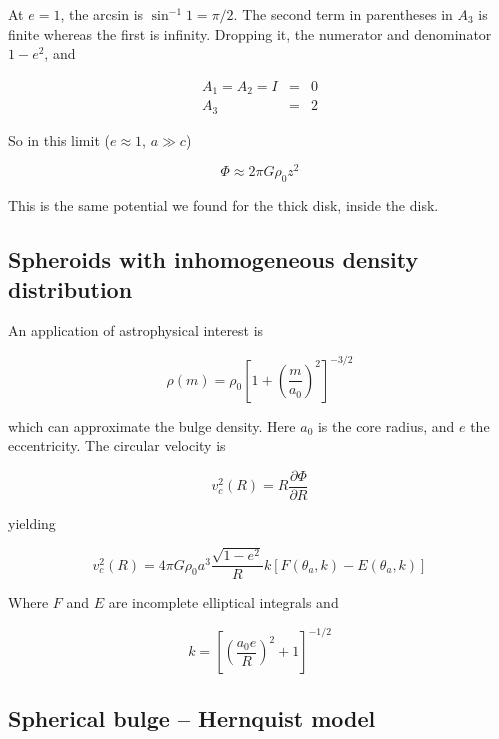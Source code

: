 At $e=1$, the arcsin is $\sin^{-1} 1 = \pi/2$. The second term in parentheses in $A_3$ is finite whereas the first is infinity. Dropping it, the numerator and denominator $1-e^2$, and 

\begin{eqnarray}
A_1=A_2 = I &=& 0 \\
A_3&=&2
\end{eqnarray}

So in this limit ($e\approx 1$, $a\gg c$) 

\begin{equation}
\varPhi \approx 2\pi G \rho_0 z^2 
\end{equation}

This is the same potential we found for the thick disk, inside the disk.

\subsection{Spheroids with inhomogeneous density distribution}

An application of astrophysical interest is 

\begin{equation}
\rho(m) = \rho_0 \left[ 1 + \left(\frac{m}{a_0}\right)^2\right]^{-3/2}  
\end{equation}

which can approximate the bulge density. Here $a_0$ is the core radius, and $e$ the eccentricity. The circular velocity is 

\begin{equation}
v^2_c (R)  = R\frac{\partial\varPhi}{\partial R} 
\end{equation}

yielding

\begin{equation}
v^2_c (R)  = 4\pi G\rho_0 a^3 \frac{\sqrt{1-e^2}}{R} k \left[F(\theta_a,k) - E(\theta_a,k) \right]
\end{equation}

Where $F$ and $E$ are incomplete elliptical integrals and 

\begin{equation}
k = \left[\left(\frac{a_0e}{R}\right)^2+1\right]^{-1/2} 
\end{equation}


\subsection{Spherical bulge -- Hernquist model}

